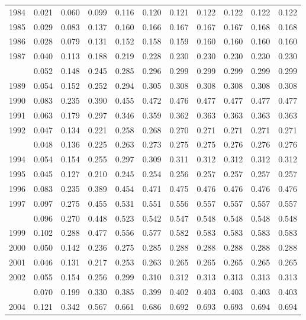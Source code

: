 \documentclass[
]{article}
\begin{document}
\begin{longtable}[t]{lrrrrrrrrrr}
1984 & 0.021 & 0.060 & 0.099 & 0.116 & 0.120 & 0.121 & 0.122 & 0.122 & 0.122 & 0.122\\
1985 & 0.029 & 0.083 & 0.137 & 0.160 & 0.166 & 0.167 & 0.167 & 0.167 & 0.168 & 0.168\\
1986 & 0.028 & 0.079 & 0.131 & 0.152 & 0.158 & 0.159 & 0.160 & 0.160 & 0.160 & 0.160\\
1987 & 0.040 & 0.113 & 0.188 & 0.219 & 0.228 & 0.230 & 0.230 & 0.230 & 0.230 & 0.230\\
\addlinespace
1988 & 0.052 & 0.148 & 0.245 & 0.285 & 0.296 & 0.299 & 0.299 & 0.299 & 0.299 & 0.299\\
1989 & 0.054 & 0.152 & 0.252 & 0.294 & 0.305 & 0.308 & 0.308 & 0.308 & 0.308 & 0.308\\
1990 & 0.083 & 0.235 & 0.390 & 0.455 & 0.472 & 0.476 & 0.477 & 0.477 & 0.477 & 0.477\\
1991 & 0.063 & 0.179 & 0.297 & 0.346 & 0.359 & 0.362 & 0.363 & 0.363 & 0.363 & 0.363\\
1992 & 0.047 & 0.134 & 0.221 & 0.258 & 0.268 & 0.270 & 0.271 & 0.271 & 0.271 & 0.271\\
\addlinespace
1993 & 0.048 & 0.136 & 0.225 & 0.263 & 0.273 & 0.275 & 0.275 & 0.276 & 0.276 & 0.276\\
1994 & 0.054 & 0.154 & 0.255 & 0.297 & 0.309 & 0.311 & 0.312 & 0.312 & 0.312 & 0.312\\
1995 & 0.045 & 0.127 & 0.210 & 0.245 & 0.254 & 0.256 & 0.257 & 0.257 & 0.257 & 0.257\\
1996 & 0.083 & 0.235 & 0.389 & 0.454 & 0.471 & 0.475 & 0.476 & 0.476 & 0.476 & 0.476\\
1997 & 0.097 & 0.275 & 0.455 & 0.531 & 0.551 & 0.556 & 0.557 & 0.557 & 0.557 & 0.557\\
\addlinespace
1998 & 0.096 & 0.270 & 0.448 & 0.523 & 0.542 & 0.547 & 0.548 & 0.548 & 0.548 & 0.548\\
1999 & 0.102 & 0.288 & 0.477 & 0.556 & 0.577 & 0.582 & 0.583 & 0.583 & 0.583 & 0.583\\
2000 & 0.050 & 0.142 & 0.236 & 0.275 & 0.285 & 0.288 & 0.288 & 0.288 & 0.288 & 0.288\\
2001 & 0.046 & 0.131 & 0.217 & 0.253 & 0.263 & 0.265 & 0.265 & 0.265 & 0.265 & 0.265\\
2002 & 0.055 & 0.154 & 0.256 & 0.299 & 0.310 & 0.312 & 0.313 & 0.313 & 0.313 & 0.313\\
\addlinespace
2003 & 0.070 & 0.199 & 0.330 & 0.385 & 0.399 & 0.402 & 0.403 & 0.403 & 0.403 & 0.403\\
2004 & 0.121 & 0.342 & 0.567 & 0.661 & 0.686 & 0.692 & 0.693 & 0.693 & 0.694 & 0.694\\

\end{longtable}
\end{document}

